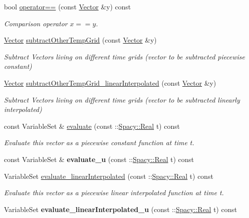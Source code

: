 \begin{DoxyCompactItemize}
bool \hyperlink{classSpacy_1_1KaskadeParabolic_1_1Vector_a1c24c613b0b90f542735ee55da63341b}{operator==} (const \hyperlink{classSpacy_1_1KaskadeParabolic_1_1Vector}{Vector} \&y) const 
\begin{DoxyCompactList}\small\item\em Comparison operator $ x==y$. \end{DoxyCompactList}\item 
\hyperlink{classSpacy_1_1KaskadeParabolic_1_1Vector}{Vector} \hyperlink{classSpacy_1_1KaskadeParabolic_1_1Vector_a2a9023f1ef8961e7ef0bc46b78980e1f}{subtract\-Other\-Temp\-Grid} (const \hyperlink{classSpacy_1_1KaskadeParabolic_1_1Vector}{Vector} \&y)
\begin{DoxyCompactList}\small\item\em Subtract Vectors living on different time grids (vector to be subtracted piecewise constant) \end{DoxyCompactList}\item 
\hyperlink{classSpacy_1_1KaskadeParabolic_1_1Vector}{Vector} \hyperlink{classSpacy_1_1KaskadeParabolic_1_1Vector_ab740b45461f8aade1842b474d0f5660d}{subtract\-Other\-Temp\-Grid\-\_\-linear\-Interpolated} (const \hyperlink{classSpacy_1_1KaskadeParabolic_1_1Vector}{Vector} \&y)
\begin{DoxyCompactList}\small\item\em Subtract Vectors living on different time grids (vector to be subtracted linearly interpolated) \end{DoxyCompactList}\item 
const Variable\-Set \& \hyperlink{classSpacy_1_1KaskadeParabolic_1_1Vector_adb5a2d8e0aae2b00d9284e08a0f1448d}{evaluate} (const \-::\hyperlink{classSpacy_1_1Real}{Spacy\-::\-Real} t) const 
\begin{DoxyCompactList}\small\item\em Evaluate this vector as a piecewise constant function at time t. \end{DoxyCompactList}\item 
\hypertarget{classSpacy_1_1KaskadeParabolic_1_1Vector_a84374f259f5eb22c6301d4cb703ff94a}{const Variable\-Set \& {\bfseries evaluate\-\_\-u} (const \-::\hyperlink{classSpacy_1_1Real}{Spacy\-::\-Real} t) const }\label{classSpacy_1_1KaskadeParabolic_1_1Vector_a84374f259f5eb22c6301d4cb703ff94a}

\item 
Variable\-Set \hyperlink{classSpacy_1_1KaskadeParabolic_1_1Vector_a63221c43f8424b19a341f76060df173d}{evaluate\-\_\-linear\-Interpolated} (const \-::\hyperlink{classSpacy_1_1Real}{Spacy\-::\-Real} t) const 
\begin{DoxyCompactList}\small\item\em Evaluate this vector as a piecewise linear interpolated function at time t. \end{DoxyCompactList}\item 
\hypertarget{classSpacy_1_1KaskadeParabolic_1_1Vector_a6c8b43f967acb7fa19717d07358f1ac6}{Variable\-Set {\bfseries evaluate\-\_\-linear\-Interpolated\-\_\-u} (const \-::\hyperlink{classSpacy_1_1Real}{Spacy\-::\-Real} t) const }\label{classSpacy_1_1KaskadeParabolic_1_1Vector_a6c8b43f967acb7fa19717d07358f1ac6}


\end{DoxyCompactItemize}
